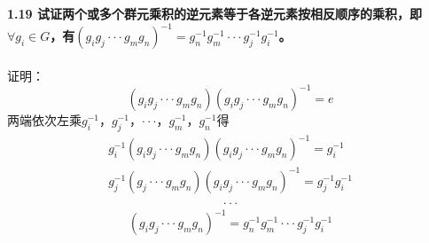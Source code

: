 \documentclass[12pt]{article}
\numberwithin{equation}{section}	 %
\begin{document}
\begin{spacing}{1.5}
~\\
~\\
\textbf{1.19 \quad 试证两个或多个群元乘积的逆元素等于各逆元素按相反顺序的乘积，即$\forall g_{i} \in G$，有$(g_{i}g_{j} \cdot\cdot\cdot g_{m}g_{n})^{-1} = g_{n}^{-1}g_{m}^{-1} \cdot\cdot\cdot g_{j}^{-1}g_{i}^{-1}$。}\\
~\\
证明：
\begin{equation}
(g_{i}g_{j} \cdot\cdot\cdot g_{m}g_{n})(g_{i}g_{j} \cdot\cdot\cdot g_{m}g_{n})^{-1} = e
\end{equation}
两端依次左乘$g_{i}^{-1}$，$g_{j}^{-1}$，$\cdot\cdot\cdot$，$g_{m}^{-1}$，$g_{n}^{-1}$得
\begin{align*}
g_{i}^{-1}(g_{i}g_{j} \cdot\cdot\cdot g_{m}g_{n})(g_{i}g_{j} \cdot\cdot\cdot g_{m}g_{n})^{-1} = g_{i}^{-1} \\
g_{j}^{-1}(g_{j} \cdot\cdot\cdot g_{m}g_{n})(g_{i}g_{j} \cdot\cdot\cdot g_{m}g_{n})^{-1} = g_{j}^{-1}g_{i}^{-1} \\
\end{align*}
$$\cdot\cdot\cdot$$ 
\begin{align*}
(g_{i}g_{j} \cdot\cdot\cdot g_{m}g_{n})^{-1} = g_{n}^{-1}g_{m}^{-1} \cdot\cdot\cdot g_{j}^{-1}g_{i}^{-1} 
\end{align*}



\newpage

\end{spacing}
\end{document}
